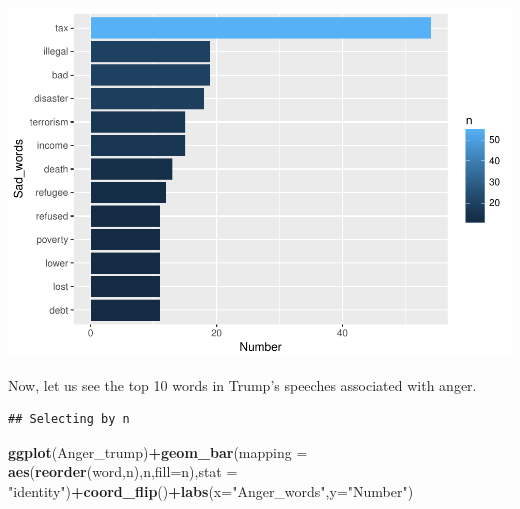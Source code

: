\documentclass[]{article}
\newenvironment{Shaded}{\begin{snugshade}}{\end{snugshade}}
\newcommand{\KeywordTok}[1]{\textcolor[rgb]{0.13,0.29,0.53}{\textbf{#1}}}
\newcommand{\DataTypeTok}[1]{\textcolor[rgb]{0.13,0.29,0.53}{#1}}
\newcommand{\DecValTok}[1]{\textcolor[rgb]{0.00,0.00,0.81}{#1}}
\newcommand{\StringTok}[1]{\textcolor[rgb]{0.31,0.60,0.02}{#1}}
\newcommand{\OperatorTok}[1]{\textcolor[rgb]{0.81,0.36,0.00}{\textbf{#1}}}
\newcommand{\NormalTok}[1]{#1}
\begin{document}
\includegraphics{Donald_Trump_Speech_sentiment_analysis_files/figure-latex/unnamed-chunk-33-1.pdf}

Now, let us see the top 10 words in Trump's speeches associated with
anger.

\begin{Shaded}
\end{Shaded}

\begin{verbatim}
## Selecting by n
\end{verbatim}

\begin{Shaded}
\begin{Highlighting}[]
\KeywordTok{ggplot}\NormalTok{(Anger_trump)}\OperatorTok{+}\KeywordTok{geom_bar}\NormalTok{(}\DataTypeTok{mapping =} \KeywordTok{aes}\NormalTok{(}\KeywordTok{reorder}\NormalTok{(word,n),n,}\DataTypeTok{fill=}\NormalTok{n),}\DataTypeTok{stat =} \StringTok{"identity"}\NormalTok{)}\OperatorTok{+}\KeywordTok{coord_flip}\NormalTok{()}\OperatorTok{+}\KeywordTok{labs}\NormalTok{(}\DataTypeTok{x=}\StringTok{"Anger_words"}\NormalTok{,}\DataTypeTok{y=}\StringTok{"Number"}\NormalTok{)}
\end{Highlighting}
\end{Shaded}
\end{document}
